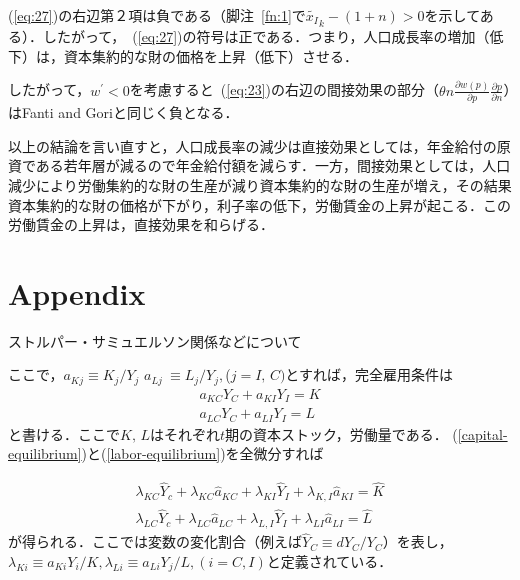 \documentclass[12pt,a4paper]{jsarticle}
\begin{document}
(\ref{eq:27})の右辺第２項は負である（脚注~\ref{fn:1}で$\tilde{x_{I}}_{k} - (1+n) >0$を示してある）．したがって，~(\ref{eq:27})の符号は正である．つまり，人口成長率の増加（低下）は，資本集約的な財の価格を上昇（低下）させる．

したがって，$w^{\prime}<0$を考慮すると~(\ref{eq:23})の右辺の間接効果の部分（$\theta n \frac{\partial w(p)}{\partial p} \frac{\partial p}{\partial n}$）はFanti and Goriと同じく負となる．

以上の結論を言い直すと，人口成長率の減少は直接効果としては，年金給付の原資である若年層が減るので年金給付額を減らす．一方，間接効果としては，人口減少により労働集約的な財の生産が減り資本集約的な財の生産が増え，その結果資本集約的な財の価格が下がり，利子率の低下，労働賃金の上昇が起こる．この労働賃金の上昇は，直接効果を和らげる．



\section{Appendix}
ストルパー・サミュエルソン関係などについて

ここで，$a_{Kj} \equiv K_{j}/Y_{j}$ $a_{Lj} \ \equiv  L_{j}/Y_{j},$($j= I, \, C)$とすれば，完全雇用条件は
\begin{align}
 a_{KC}Y_{C} + a_{KI} Y_{I} =K \label{capital-equilibrium} \\
a_{LC}Y_{C} + a_{LI} Y_{I} = L \label{labor-equilibrium}
\end{align}
と書ける．ここで$K, \, L$はそれぞれ$t$期の資本ストック，労働量である．
(\ref{capital-equilibrium})と(\ref{labor-equilibrium})を全微分すれば


\begin{align}
	\lambda_{KC} \hat{Y}_{c} + \lambda_{KC} \hat{a}_{KC} +\lambda_{KI} \hat{Y}_{I} + \lambda_{K,I} \hat{a}_{KI} = \hat{K} \label{repsonseincapital-equilibrium}\\
	\lambda_{LC} \hat{Y}_{c} + \lambda_{LC} \hat{a}_{LC} +\lambda_{L,I} \hat{Y}_{I} + \lambda_{LI} \hat{a}_{LI} = \hat{L} \label{repsonseinlabor-equilibrium}
\end{align}
が得られる．ここで$\hat{}$は変数の変化割合（例えば$\hat{Y}_{C} \equiv dY_{C}/Y_{C}$）を表し，$\lambda_{Ki} \equiv a_{Ki}Y_{i}/K, \lambda_{Li} \equiv a_{Li}Y_{j}/L, (i = C, I)$と定義されている．
\end{document}

